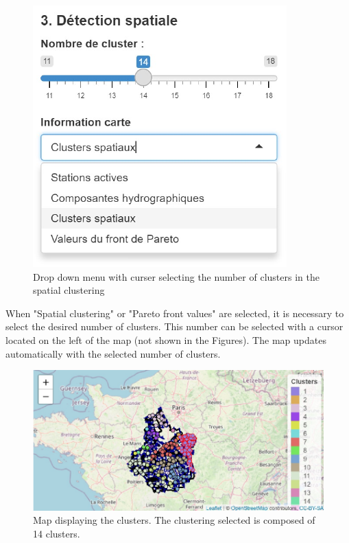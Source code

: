\begin{figure}[htbp]
  \centering
  \includegraphics[]{figs/Chap6/Im_appbis.pdf}
  \caption{Drop down menu with curser selecting the number of clusters in the spatial clustering}
  \label{fig:Imapp}
\end{figure}   
   
When "Spatial clustering" or "Pareto front values" are selected, it is necessary to select the desired number of clusters. This number can be selected with a cursor located on the left of the map (not shown in the Figures). The map updates automatically with the selected number of clusters. 

\begin{figure}[htbp]
  \centering
  \includegraphics[]{figs/Chap6/Im_appbis6.pdf}
  \caption{Map displaying the clusters. The clustering selected is composed of 14 clusters.}
  \label{fig:Imapp6}
\end{figure}

